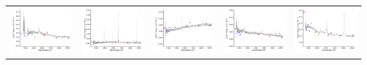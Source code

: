 \begin{center}
\begin{longtable}{l l l l l }
    \includegraphics[width=0.2\linewidth, clip]{Figs/Figs-sdss/spec-9163-58043-0440-STRIPE82-0120-045064.pdf} & \includegraphics[width=0.2\linewidth, clip]{Figs/Figs-sdss/spec-9166-58051-0118-STRIPE82-0132-037548.pdf} & \includegraphics[width=0.2\linewidth, clip]{Figs/Figs-sdss/spec-9168-58067-0396-STRIPE82-0136-026983.pdf} & \includegraphics[width=0.2\linewidth, clip]{Figs/Figs-sdss/spec-9172-58015-0449-STRIPE82-0148-018355.pdf} & \includegraphics[width=0.2\linewidth, clip]{Figs/Figs-sdss/spec-9180-57693-0793-STRIPE82-0120-000615.pdf} \\

\end{longtable}
\end{center}
